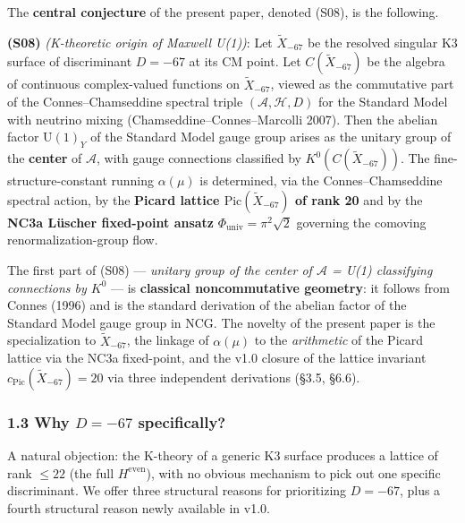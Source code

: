 \documentclass[
  11pt,
  a4paper,
]{article}
\begin{document}
The \textbf{central conjecture} of the present paper, denoted (S08), is the following.

\textbf{(S08)} \emph{(K-theoretic origin of Maxwell U(1))}: Let \(\tilde X_{-67}\) be the resolved singular K3 surface of discriminant \(D = -67\) at its CM point. Let \(C(\tilde X_{-67})\) be the algebra of continuous complex-valued functions on \(\tilde X_{-67}\), viewed as the commutative part of the Connes--Chamseddine spectral triple \((\mathcal{A}, \mathcal{H}, D)\) for the Standard Model with neutrino mixing (Chamseddine--Connes--Marcolli 2007). Then the abelian factor \(\mathrm{U}(1)_Y\) of the Standard Model gauge group arises as the unitary group of the \textbf{center} of \(\mathcal{A}\), with gauge connections classified by \(K^0(C(\tilde X_{-67}))\). The fine-structure-constant running \(\alpha(\mu)\) is determined, via the Connes--Chamseddine spectral action, by the \textbf{Picard lattice \(\mathrm{Pic}(\tilde X_{-67})\) of rank 20} and by the \textbf{NC3a Lüscher fixed-point ansatz} \(\Phi_{\mathrm{univ}} = \pi^2\sqrt 2\) governing the comoving renormalization-group flow.

The first part of (S08) --- \emph{unitary group of the center of \(\mathcal A\) = U(1) classifying connections by \(K^0\)} --- is \textbf{classical noncommutative geometry}: it follows from Connes (1996) and is the standard derivation of the abelian factor of the Standard Model gauge group in NCG. The novelty of the present paper is the specialization to \(\tilde X_{-67}\), the linkage of \(\alpha(\mu)\) to the \emph{arithmetic} of the Picard lattice via the NC3a fixed-point, and the v1.0 closure of the lattice invariant \(c_{\mathrm{Pic}}(\tilde X_{-67}) = 20\) via three independent derivations (§3.5, §6.6).

\hypertarget{why-d--67-specifically}{%
\subsubsection{\texorpdfstring{1.3 Why \(D = -67\) specifically?}{1.3 Why D = -67 specifically?}}\label{why-d--67-specifically}}

A natural objection: the K-theory of a generic K3 surface produces a lattice of rank \(\le 22\) (the full \(H^{\mathrm{even}}\)), with no obvious mechanism to pick out one specific discriminant. We offer three structural reasons for prioritizing \(D = -67\), plus a fourth structural reason newly available in v1.0.
\end{document}
